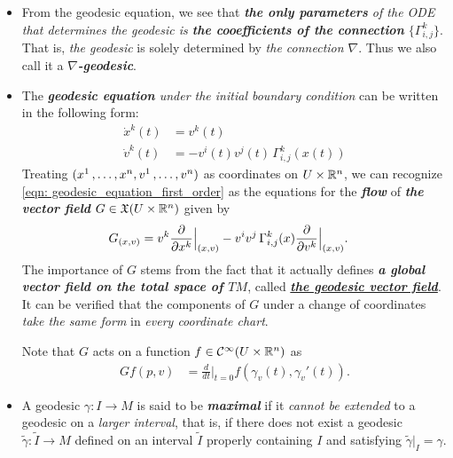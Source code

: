 \documentclass[11pt]{article}
\begin{document}
\begin{itemize}
\item \begin{remark}
From the geodesic equation, we see that \emph{\textbf{the only parameters} of the ODE that determines the geodesic is \textbf{the cooefficients of the connection} $\{\Gamma_{i,j}^{k}\}$}. That is, \emph{the geodesic} is solely determined by \emph{the connection $\nabla$}. Thus we also call it a \emph{\textbf{$\nabla$-geodesic}}.
\end{remark}

\item \begin{remark} The \emph{\textbf{geodesic equation} under the initial boundary condition} can be written in the following form:
\begin{align}
\dot{x}^k(t) &= v^{k}(t) \\
\dot{v}^k(t) &= - v^{i}(t)v^j(t)\,\Gamma_{i,j}^{k}(x(t)) \label{eqn: geodesic_equation_first_order}
\end{align} Treating $(x^1 \,{,}\ldots{,}\, x^n, v^1 \,{,}\ldots{,}\, v^n)$ as coordinates on $U \times {\mathbb R}^n$, we can recognize \eqref{eqn: geodesic_equation_first_order} as the equations for the \textbf{\emph{flow}} of \textbf{\emph{the vector field}} $G \in {\mathfrak X}(U \times {\mathbb R}^n)$ given by
\begin{align}
G_{(x, v)} &= v^k\frac{\partial }{ \partial x^k}\Bigr|_{(x, v)} - v^{i}v^j\,\Gamma_{i,j}^{k}(x)\frac{\partial }{ \partial v^k}\Bigr|_{(x, v)}.
\end{align} The importance of $G$ stems from the fact that it actually defines \emph{\textbf{a global vector field on the total space of $TM$}}, called \underline{\emph{\textbf{the geodesic vector field}}}. It can be verified that the components of $G$ under a change of coordinates \emph{take the same form} in \emph{every coordinate chart}.

Note that $G$ acts on a function $f \in {\mathcal C}^{\infty}(U \times {\mathbb R}^n)$ as
\begin{align}
Gf(p, v) &= \frac{d}{dt}\Bigr|_{t=0}f(\gamma_v(t), \gamma_v'(t)). \label{eqn: geodesic_vector_field_act_function}
\end{align}
\end{remark}

\item \begin{definition}
A geodesic $\gamma: I \rightarrow M$  is said to be \emph{\textbf{maximal}} if it \emph{cannot be extended} to a geodesic on a \emph{larger interval}, that is, if there does not exist a geodesic $\widetilde{\gamma}: \widetilde{I} \rightarrow M$ defined on an interval $\widetilde{I}$ properly containing $I$ and satisfying $\widetilde{\gamma}|_{I} = \gamma$. 


\end{definition}
\end{itemize}
\end{document}
